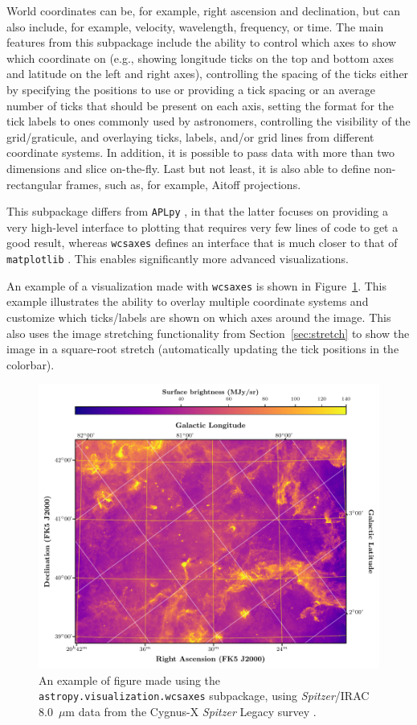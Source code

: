 \documentclass[modern]{aastex61}
\newcommand{\package}[1]{\texttt{#1}\xspace}
\newcommand{\sectionname}{Section\xspace}
\renewcommand{\figurename}{Figure\xspace}
\begin{document}
World coordinates can be, for example, right ascension and declination, but can
also include, for example, velocity, wavelength, frequency, or time.
The main features from this subpackage include the ability to control which
axes to show which coordinate on (e.g., showing longitude ticks on the
top and bottom axes and latitude on the left and right axes), controlling the
spacing of the ticks either by specifying the positions to use or providing a
tick spacing or an average number of ticks that should be present on each axis,
setting the format for the tick labels to ones commonly used by astronomers,
controlling the visibility of the grid/graticule, and overlaying ticks, labels,
and/or grid lines from different coordinate systems. In addition, it is
possible to pass data with more than two dimensions and slice on-the-fly.
Last but not least, it is also able to define non-rectangular frames, such as,
for example, Aitoff projections.

This subpackage differs from \package{APLpy} \citep{aplpy}, in that the latter
focuses on providing a very high-level interface to plotting that requires very
few lines of code to get a good result, whereas \package{wcsaxes} defines an
interface that is much closer to that of \package{matplotlib} \citep{matplotlib}.
This enables significantly more advanced visualizations.

An example of a visualization made with \package{wcsaxes} is shown in
\figurename~\ref{fig:wcsaxes}. This example illustrates the ability to
overlay multiple coordinate systems and customize which ticks/labels are shown
on which axes around the image. This also uses the image stretching
functionality from \sectionname~\ref{sec:stretch} to show the image in a
square-root stretch (automatically updating the tick positions in the colorbar).

\begin{figure}
\includegraphics[width=\textwidth]{cygnus_x_spitzer.pdf}
\caption{%
An example of figure made using the \package{astropy.visualization.wcsaxes}
subpackage, using \textit{Spitzer}/IRAC 8.0~$\mu$m data from the Cygnus-X
\textit{Spitzer} Legacy survey \citep{cygnusx}.
\label{fig:wcsaxes}
}
\end{figure}
\end{document}
